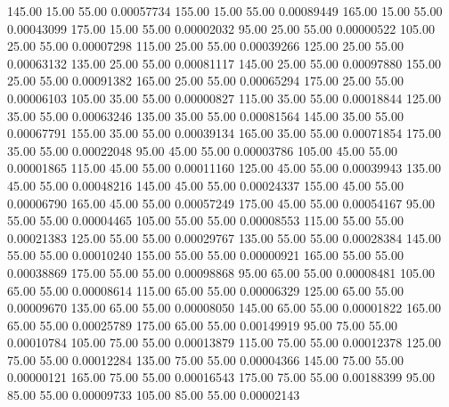    145.00     15.00     55.00     0.00057734
    155.00     15.00     55.00     0.00089449
    165.00     15.00     55.00     0.00043099
    175.00     15.00     55.00     0.00002032
     95.00     25.00     55.00     0.00000522
    105.00     25.00     55.00     0.00007298
    115.00     25.00     55.00     0.00039266
    125.00     25.00     55.00     0.00063132
    135.00     25.00     55.00     0.00081117
    145.00     25.00     55.00     0.00097880
    155.00     25.00     55.00     0.00091382
    165.00     25.00     55.00     0.00065294
    175.00     25.00     55.00     0.00006103
    105.00     35.00     55.00     0.00000827
    115.00     35.00     55.00     0.00018844
    125.00     35.00     55.00     0.00063246
    135.00     35.00     55.00     0.00081564
    145.00     35.00     55.00     0.00067791
    155.00     35.00     55.00     0.00039134
    165.00     35.00     55.00     0.00071854
    175.00     35.00     55.00     0.00022048
     95.00     45.00     55.00     0.00003786
    105.00     45.00     55.00     0.00001865
    115.00     45.00     55.00     0.00011160
    125.00     45.00     55.00     0.00039943
    135.00     45.00     55.00     0.00048216
    145.00     45.00     55.00     0.00024337
    155.00     45.00     55.00     0.00006790
    165.00     45.00     55.00     0.00057249
    175.00     45.00     55.00     0.00054167
     95.00     55.00     55.00     0.00004465
    105.00     55.00     55.00     0.00008553
    115.00     55.00     55.00     0.00021383
    125.00     55.00     55.00     0.00029767
    135.00     55.00     55.00     0.00028384
    145.00     55.00     55.00     0.00010240
    155.00     55.00     55.00     0.00000921
    165.00     55.00     55.00     0.00038869
    175.00     55.00     55.00     0.00098868
     95.00     65.00     55.00     0.00008481
    105.00     65.00     55.00     0.00008614
    115.00     65.00     55.00     0.00006329
    125.00     65.00     55.00     0.00009670
    135.00     65.00     55.00     0.00008050
    145.00     65.00     55.00     0.00001822
    165.00     65.00     55.00     0.00025789
    175.00     65.00     55.00     0.00149919
     95.00     75.00     55.00     0.00010784
    105.00     75.00     55.00     0.00013879
    115.00     75.00     55.00     0.00012378
    125.00     75.00     55.00     0.00012284
    135.00     75.00     55.00     0.00004366
    145.00     75.00     55.00     0.00000121
    165.00     75.00     55.00     0.00016543
    175.00     75.00     55.00     0.00188399
     95.00     85.00     55.00     0.00009733
    105.00     85.00     55.00     0.00002143
